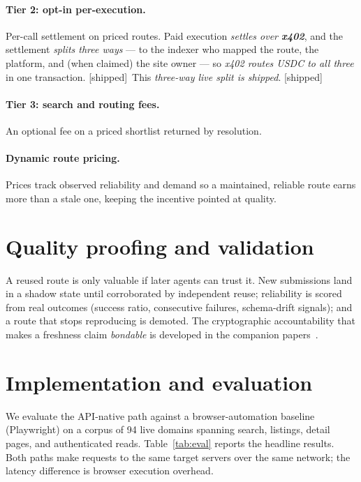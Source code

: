 \documentclass[11pt]{article}
\newcommand{\impl}{\textcolor{green!55!black}{\small[shipped]}}
\begin{document}
\paragraph{Tier 2: opt-in per-execution.} Per-call settlement on priced routes.
Paid execution \emph{settles over \textbf{x402}}, and the settlement \emph{splits
three ways} --- to the indexer who mapped the route, the platform, and (when
claimed) the site owner --- so \emph{x402 routes USDC to all three} in one
transaction. \impl\ This \emph{three-way live split is shipped}. \impl
\paragraph{Tier 3: search and routing fees.} An optional fee on a priced shortlist
returned by resolution.
\paragraph{Dynamic route pricing.} Prices track observed reliability and demand so
a maintained, reliable route earns more than a stale one, keeping the incentive
pointed at quality.

\section{Quality proofing and validation}
A reused route is only valuable if later agents can trust it. New submissions land
in a shadow state until corroborated by independent reuse; reliability is scored
from real outcomes (success ratio, consecutive failures, schema-drift signals); and
a route that stops reproducing is demoted. The cryptographic accountability that
makes a freshness claim \emph{bondable} is developed in the companion
papers~\cite{security,maintenance}.

\section{Implementation and evaluation}
We evaluate the API-native path against a browser-automation baseline (Playwright)
on a corpus of 94 live domains spanning search, listings, detail pages, and
authenticated reads. Table~\ref{tab:eval} reports the headline results. Both paths
make requests to the same target servers over the same network; the latency
difference is browser execution overhead.
\end{document}

